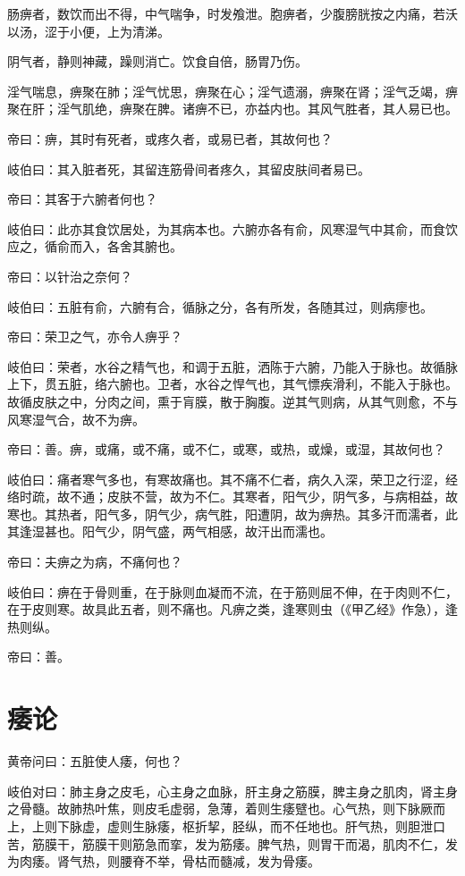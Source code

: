 \documentclass{article}%
\begin{document}
肠痹者，数饮而出不得，中气喘争，时发飧泄。胞痹者，少腹膀胱按之内痛，若沃以汤，涩于小便，上为清涕。

阴气者，静则神藏，躁则消亡。饮食自倍，肠胃乃伤。

淫气喘息，痹聚在肺；淫气忧思，痹聚在心；淫气遗溺，痹聚在肾；淫气乏竭，痹聚在肝；淫气肌绝，痹聚在脾。诸痹不已，亦益内也。其风气胜者，其人易已也。

帝曰：痹，其时有死者，或疼久者，或易已者，其故何也？

岐伯曰：其入脏者死，其留连筋骨间者疼久，其留皮肤间者易已。

帝曰：其客于六腑者何也？

岐伯曰：此亦其食饮居处，为其病本也。六腑亦各有俞，风寒湿气中其俞，而食饮应之，循俞而入，各舍其腑也。

帝曰：以针治之奈何？

岐伯曰：五脏有俞，六腑有合，循脉之分，各有所发，各随其过，则病瘳也。

帝曰：荣卫之气，亦令人痹乎？

岐伯曰：荣者，水谷之精气也，和调于五脏，洒陈于六腑，乃能入于脉也。故循脉上下，贯五脏，络六腑也。卫者，水谷之悍气也，其气慓疾滑利，不能入于脉也。故循皮肤之中，分肉之间，熏于肓膜，散于胸腹。逆其气则病，从其气则愈，不与风寒湿气合，故不为痹。

帝曰：善。痹，或痛，或不痛，或不仁，或寒，或热，或燥，或湿，其故何也？

岐伯曰：痛者寒气多也，有寒故痛也。其不痛不仁者，病久入深，荣卫之行涩，经络时疏，故不通；皮肤不营，故为不仁。其寒者，阳气少，阴气多，与病相益，故寒也。其热者，阳气多，阴气少，病气胜，阳遭阴，故为痹热。其多汗而濡者，此其逢湿甚也。阳气少，阴气盛，两气相感，故汗出而濡也。

帝曰：夫痹之为病，不痛何也？

岐伯曰：痹在于骨则重，在于脉则血凝而不流，在于筋则屈不伸，在于肉则不仁，在于皮则寒。故具此五者，则不痛也。凡痹之类，逢寒则虫（《甲乙经》作急），逢热则纵。

帝曰：善。
\section{痿论}
黄帝问曰：五脏使人痿，何也？

岐伯对曰：肺主身之皮毛，心主身之血脉，肝主身之筋膜，脾主身之肌肉，肾主身之骨髓。故肺热叶焦，则皮毛虚弱，急薄，着则生痿躄也。心气热，则下脉厥而上，上则下脉虚，虚则生脉痿，枢折挈，胫纵，而不任地也。肝气热，则胆泄口苦，筋膜干，筋膜干则筋急而挛，发为筋痿。脾气热，则胃干而渴，肌肉不仁，发为肉痿。肾气热，则腰脊不举，骨枯而髓减，发为骨痿。
\end{document}
